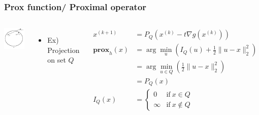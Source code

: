\documentclass{beamer}
\begin{document}
\begin{frame}
\frametitle{Prox function/ Proximal operator}
\begin{columns}
\centering
\includegraphics[scale=0.5]{L16_fig_projection}
\begin{itemize}
\item Ex) Projection on set $Q$
\end{itemize}
\begin{align*}
x^{(k+1)} &= P_Q \left( x^{(k)}-t \nabla g(x^{(k)})\right)\\
\textbf{prox}_h (x) &= \arg\min_u \left( I_Q (u) + \frac{1}{2}\|u-x\|_2^2 \right)\\
&= \arg\min_{u \in Q} \left( \frac{1}{2}\|u-x\|_2^2 \right)\\
&= P_Q (x)\\
I_Q (x) &=  \begin{cases}
	0 & \text{if}~x \in Q \\
	\infty & \text{if}~x \notin Q
	\end{cases}
\end{align*}
\end{columns} 

\end{frame}
\end{document}
